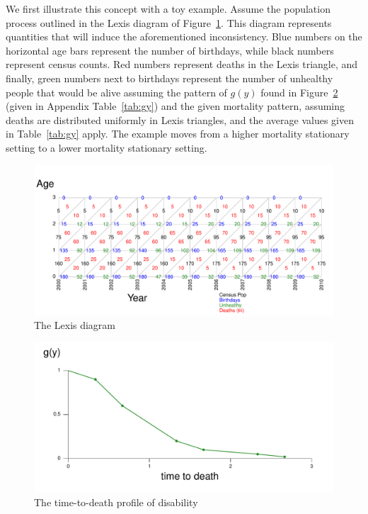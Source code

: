 \documentclass[11pt,oneside,a4paper]{article} %
\begin{document}
We first illustrate this concept with a toy example. Assume the population
process outlined in the Lexis diagram of Figure~\ref{fig:Fig_DiagramLexis}. This
diagram represents quantities that will induce the aforementioned inconsistency.
Blue numbers on the horizontal age bars represent the number of birthdays, while
black numbers represent census counts. Red numbers represent deaths in the
Lexis triangle, and finally, green numbers next to birthdays represent the
number of unhealthy people that would be alive assuming the pattern of $g(y)$
found in Figure~\ref{fig:Fig_TTDgy} (given in Appendix Table~\ref{tab:gy}) and
the given mortality pattern, assuming deaths are distributed uniformly in Lexis
triangles, and the average values given in Table~\ref{tab:gy} apply. The example
moves from a higher mortality stationary setting to a lower mortality stationary
setting.

\begin{figure}
\begin{adjustwidth}{-1.5cm}{}
	\centering
	\includegraphics[scale=.6]{Figures/DiagramLexis.pdf}
	\caption{The Lexis diagram}
	\label{fig:Fig_DiagramLexis}
\end{adjustwidth}
\end{figure}

\begin{figure}
\begin{adjustwidth}{-1.5cm}{}
	\centering
	\includegraphics[scale=.6]{Figures/TTDgy.pdf}
	\caption{The time-to-death profile of disability}
	\label{fig:Fig_TTDgy}
\end{adjustwidth}
\end{figure}
\end{document}

